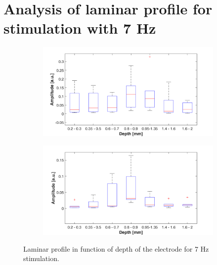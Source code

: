 \documentclass{pracalicmgr}
\begin{document}
\section{Analysis of laminar profile for stimulation with 7 Hz}  
   	\begin{figure}[H]
	\begin{subfigure}{.5\textwidth}
		\centering
		\includegraphics[width=1.\linewidth]{profile_7Hz_wid.png}
		\caption{}
		\label{rys:profil_7Hz_wid1}
	\end{subfigure}%
	\begin{subfigure}{.5\textwidth}
		\centering
		\includegraphics[width=1.\linewidth]{profile_7Hz_wid2.png}
		\caption{}
		\label{rys:profil_7Hz_wid2}
	\end{subfigure}
	
	\caption{Laminar profile in function of depth of the electrode for 7 Hz stimulation.}
	\label{rys:profil_7Hz_wid}
\end{figure}
\end{document}
